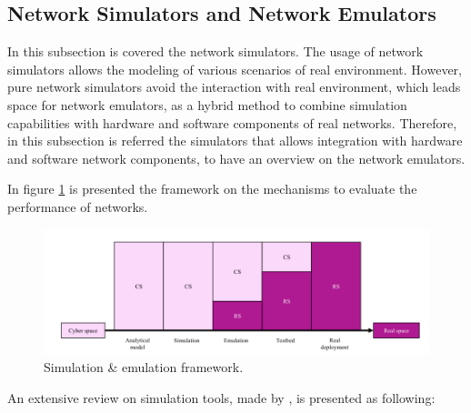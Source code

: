\subsection{Network Simulators and Network Emulators}
\label{subs:335}

In this subsection is covered the network simulators. The usage of network simulators allows the modeling of various scenarios of real environment. However, pure network simulators avoid the interaction with real environment, which leads space for network emulators, as a hybrid method to combine simulation capabilities with hardware and software components of real networks. Therefore, in this subsection is referred the simulators that allows integration with hardware and software network components, to have an overview on the network emulators.

In figure \ref{fig:simul_VS_emul} is presented the framework on the mechanisms to evaluate the performance of networks.

\begin{figure}[h!]
	\centering
	\includegraphics[width=1\textwidth,keepaspectratio]{figures/33.WirelessN/simul_VS_emul}
	\caption{Simulation \& emulation framework.}
	\label{fig:simul_VS_emul}
\end{figure}

An extensive review on simulation tools, made by \cite{nayyar2015}, is presented as following:

